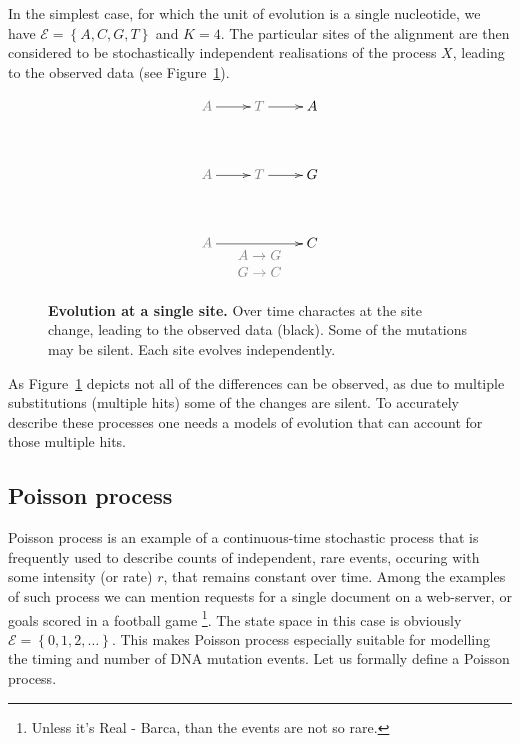 In the simplest case, for which the unit of evolution is a single nucleotide, we have $\mathcal{E}=\left\{ A,C,G,T\right\}$ and $K=4$.
The particular sites of the alignment are then considered to be stochastically independent realisations of the process $X$, leading to the observed data (see Figure~\ref{fig:alignment}). 

\begin{figure}[H]
\centering
\begingroup
\everymath{\displaystyle}
{\Large
\begin{displaymath} %
    \xymatrix@R+1pc{ 
\color{gray2}A \ar[r] & \color{gray2}T \ar[r] & A \\
\color{gray2}A \ar[r] & \color{gray2}T \ar[r] & G \\
\color{gray2}A  \ar[rr]_{ \color{gray2}\begin{array}{c}
A\rightarrow G\\
G\rightarrow C
\end{array}} &&  C
    } %
\end{displaymath}
}%
\endgroup
\caption{
{ \footnotesize 
{\bf Evolution at a single site.} Over time charactes at the site change, leading to the observed data (black). Some of the mutations may be silent. Each site evolves independently.
}%
}
\label{fig:alignment}
\end{figure}

As Figure~\ref{fig:alignment} depicts not all of the differences can be observed, as due to multiple substitutions (multiple hits) some of the changes are silent.
To accurately describe these processes one needs a models of evolution that can account for those multiple hits.

\subsection{Poisson process\label{sub:poisson}}

Poisson process is an example of a continuous-time stochastic process that is frequently used to describe counts of independent, rare events, occuring with some intensity (or rate) $r$, that remains constant over time. 
Among the examples of such process we can mention requests for a single document on a web-server, or goals scored in a football game \footnote{Unless it's Real - Barca, than the events are not so rare.}.
The state space in this case is obviously $\mathcal{E} = \left\{ 0,1,2, \dots \right\}$.
This makes Poisson process especially suitable for modelling the timing and number of DNA mutation events. 
Let us formally define a Poisson process.


